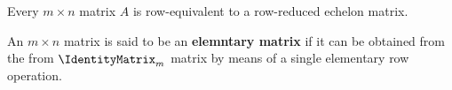 \begin{theorem}
    Every \(m \times n\) matrix \(A\) is row-equivalent to a row-reduced echelon matrix.
\end{theorem}

\begin{definition}
    An \(m \times n\) matrix is said to be an \textbf{elemntary matrix} if it can be obtained from the from \(\IdentityMatrix_m\) matrix by means of a single elementary row operation.
\end{definition}